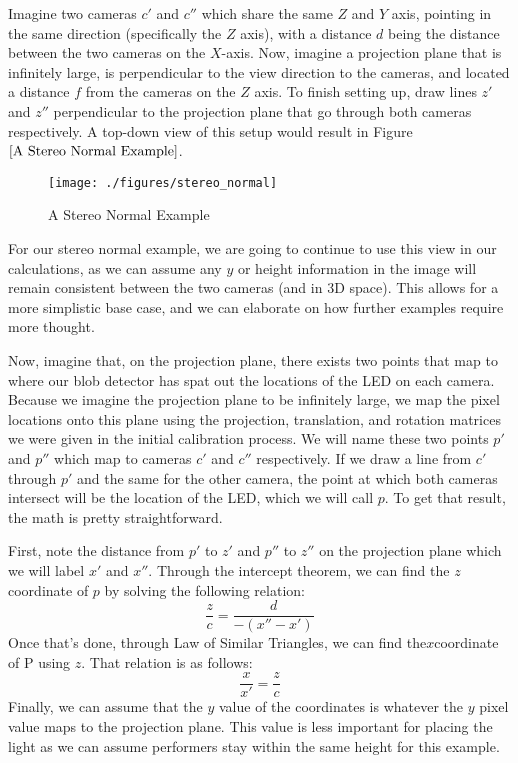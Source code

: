 \documentclass[
    12pt,
    twoside,
    bibstyle=chicago,
    headerstyle=uppercase,
	bibfile=biblatex_updating.bib
]{reedthesis}
\begin{document}
Imagine two cameras $c'$ and $c''$ which share the same $Z$ and $Y$ axis, pointing in the same direction (specifically the $Z$ axis), with a distance $d$ being the distance between the two cameras on the $X$-axis. Now, imagine a projection plane that is infinitely large, is perpendicular to the view direction to the cameras, and located a distance $f$ from the cameras on the $Z$ axis. To finish setting up, draw lines $z'$ and $z''$ perpendicular to the projection plane that go through both cameras respectively. A top-down view of this setup would result in Figure $\ref{A Stereo Normal Example}$.
	
	\begin{figure}[h]
	   
	       \centering
	        
	    \texttt{[image: ./figures/stereo\_normal]}
	     \caption{A Stereo Normal Example}
	 \label{A Stereo Normal Example}
	\end{figure}

For our stereo normal example, we are going to continue to use this view in our calculations, as we can assume any $y$ or height information in the image will remain consistent between the two cameras (and in 3D space). This allows for a more simplistic base case, and we can elaborate on how further examples require more thought.

Now, imagine that, on the projection plane, there exists two points that map to where our blob detector has spat out the locations of the LED on each camera. Because we imagine the projection plane to be infinitely large, we map the pixel locations onto this plane using the projection, translation, and rotation matrices we were given in the initial calibration process. We will name these two points $p'$ and $p''$ which map to cameras $c'$ and $c''$ respectively. If we draw a line from $c'$ through $p'$ and the same for the other camera, the point at which both cameras intersect will be the location of the LED, which we will call $p$. To get that result, the math is pretty straightforward.

First, note the distance from $p'$ to $z'$ and $p''$ to $z''$ on the projection plane which we will label $x'$ and $x''$. Through the intercept theorem, we can find the $z$ coordinate of $p$ by solving the following relation:
\[\frac{z}{c} = \frac{d}{-(x'' - x')}\]
Once that's done, through Law of Similar Triangles, we can find the$x$coordinate of P using $z$. That relation is as follows:
\[\frac{x}{x'}=\frac{z}{c}\]
Finally, we can assume that the $y$ value of the coordinates is whatever the $y$ pixel value maps to the projection plane. This value is less important for placing the light as we can assume performers stay within the same height for this example.
\end{document}
